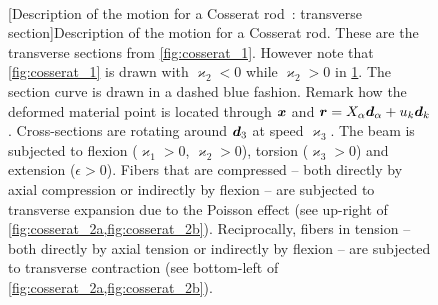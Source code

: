 \begin{figure}[p]
	\begin{fullpage}
		\captionsetup[subfloat]{captionskip=10pt}
     		\centering
		\hspace{2.5cm}
		 \\
		\vspace{20pt}
		\hspace{2.5cm}
		\vspace{20pt}
		[Description of the motion for a Cosserat rod~: transverse section]{Description of the motion for a Cosserat rod. These are the transverse sections from \cref{fig:cosserat_1}. However note that \cref{fig:cosserat_1} is drawn with $\varkappa_2 < 0$ while $\varkappa_2 > 0$ in \cref{fig:cosserat_2}. The section curve is drawn in a dashed blue fashion. Remark how the deformed material point is located through $\boldsymbol{x}$ and $\boldsymbol{r} = X_{\alpha}\boldsymbol{d}_{\alpha} + u_{k}\boldsymbol{d}_{k}$. Cross-sections are rotating around $\boldsymbol{d}_3$ at speed $\varkappa_3$. The beam is subjected to flexion ($\varkappa_1 > 0$, $\varkappa_2 > 0$), torsion ($\varkappa_3 > 0$) and extension ($\epsilon > 0$). Fibers that are compressed -- both directly by axial compression or indirectly by flexion -- are subjected to transverse expansion due to the Poisson effect (see up-right of \cref{fig:cosserat_2a,fig:cosserat_2b}). Reciprocally, fibers in tension -- both directly by axial tension or indirectly by flexion -- are subjected to transverse contraction (see bottom-left of \cref{fig:cosserat_2a,fig:cosserat_2b}).}
		\label{fig:cosserat_2}
	\end{fullpage}
\end{figure}

